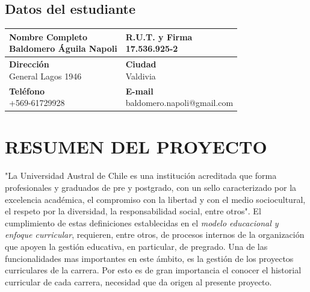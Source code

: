 \documentclass[12pt]{article}
\begin{document}
		\subsection{Datos del estudiante}
		\begin{large}
			\begin{tabular}{|l|l|}
				\hline
				
			{ \parbox[t]{7cm}{ {\bf Nombre Completo} \\Baldomero Águila Napoli}}& { \parbox[t]{7cm}{ {\bf R.U.T. y Firma} \\	17.536.925-2}}\\ 
				\hline
				{ \parbox[t]{8cm}{ {\bf Dirección} \\	General Lagos 1946}} & { \parbox[t]{8cm}{ {\bf Ciudad} \\	Valdivia}}\\ 

							
				\hline
				
				{ \parbox[t]{8cm}{ {\bf Teléfono} \\ +569-61729928}} & { \parbox[t]{8cm}{ {\bf E-mail} \\ baldomero.napoli@gmail.com}}
		\\ 
		
				\hline

			\end{tabular}
		\end{large}
		\newpage
	\section{RESUMEN DEL PROYECTO}
		
		
		
			"La Universidad Austral de Chile es una institución acreditada que forma profesionales y graduados de pre 
			y postgrado, con un sello caracterizado por la excelencia académica, el compromiso con la libertad y con 
			el medio sociocultural, el respeto por la diversidad, la responsabilidad social, entre otros"\cite{MOD07}. 
			El cumplimiento de estas definiciones establecidas en el \textit{ modelo educacional y enfoque curricular}, requieren, entre otros, de procesos internos de la organización que apoyen la gestión educativa, en particular, de pregrado. Una de las funcionalidades mas importantes en este ámbito, es la gestión de los proyectos curriculares de la carrera. Por esto es de gran importancia el conocer el historial curricular de cada carrera, necesidad que da origen al presente proyecto.
			\\
			
\end{document}
